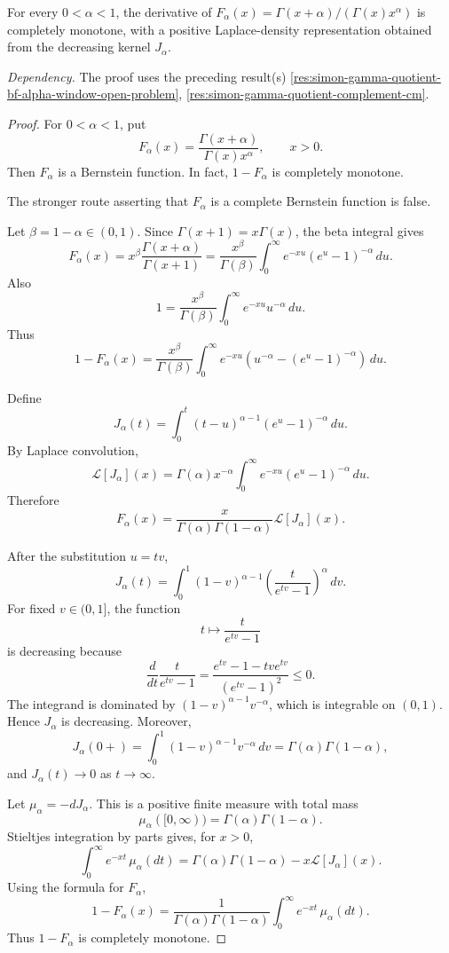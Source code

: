 \begin{theorem}
\label{res:simon-gamma-quotient-derivative-positive-laplace-density}
For every \(0<\alpha<1\), the derivative of \(F_\alpha(x)=\Gamma(x+\alpha)/(\Gamma(x)x^\alpha)\) is completely monotone, with a positive Laplace-density representation obtained from the decreasing kernel \(J_\alpha\).

\emph{Dependency.} The proof uses the preceding result(s) \ref{res:simon-gamma-quotient-bf-alpha-window-open-problem}, \ref{res:simon-gamma-quotient-complement-cm}.
\end{theorem}
\begin{proof}
For \(0<\alpha<1\), put
\[
F_\alpha(x)=\frac{\Gamma(x+\alpha)}{\Gamma(x)x^\alpha},\qquad x>0.
\]
Then \(F_\alpha\) is a Bernstein function. In fact, \(1-F_\alpha\) is completely monotone.

The stronger route asserting that \(F_\alpha\) is a complete Bernstein function is false.

Let \(\beta=1-\alpha\in(0,1)\). Since \(\Gamma(x+1)=x\Gamma(x)\), the beta integral gives
\[
F_\alpha(x)
=x^\beta\frac{\Gamma(x+\alpha)}{\Gamma(x+1)}
=\frac{x^\beta}{\Gamma(\beta)}
\int_0^\infty e^{-xu}(e^u-1)^{-\alpha}\,du.
\]
Also
\[
1=\frac{x^\beta}{\Gamma(\beta)}
\int_0^\infty e^{-xu}u^{-\alpha}\,du.
\]
Thus
\[
1-F_\alpha(x)
=\frac{x^\beta}{\Gamma(\beta)}
\int_0^\infty e^{-xu}\left(u^{-\alpha}-(e^u-1)^{-\alpha}\right)\,du.
\]

Define
\[
J_\alpha(t)=\int_0^t (t-u)^{\alpha-1}(e^u-1)^{-\alpha}\,du.
\]
By Laplace convolution,
\[
\mathcal L[J_\alpha](x)
=\Gamma(\alpha)x^{-\alpha}
\int_0^\infty e^{-xu}(e^u-1)^{-\alpha}\,du.
\]
Therefore
\[
F_\alpha(x)
=\frac{x}{\Gamma(\alpha)\Gamma(1-\alpha)}\mathcal L[J_\alpha](x).
\]

After the substitution \(u=tv\),
\[
J_\alpha(t)=
\int_0^1
(1-v)^{\alpha-1}
\left(\frac{t}{e^{tv}-1}\right)^\alpha\,dv.
\]
For fixed \(v\in(0,1]\), the function
\[
t\mapsto \frac{t}{e^{tv}-1}
\]
is decreasing because
\[
\frac{d}{dt}\frac{t}{e^{tv}-1}
=
\frac{e^{tv}-1-tv e^{tv}}{(e^{tv}-1)^2}\le0.
\]
The integrand is dominated by \((1-v)^{\alpha-1}v^{-\alpha}\), which is integrable on \((0,1)\). Hence \(J_\alpha\) is decreasing. Moreover,
\[
J_\alpha(0+)
=\int_0^1(1-v)^{\alpha-1}v^{-\alpha}\,dv
=\Gamma(\alpha)\Gamma(1-\alpha),
\]
and \(J_\alpha(t)\to0\) as \(t\to\infty\).

Let \(\mu_\alpha=-dJ_\alpha\). This is a positive finite measure with total mass
\[
\mu_\alpha([0,\infty))=\Gamma(\alpha)\Gamma(1-\alpha).
\]
Stieltjes integration by parts gives, for \(x>0\),
\[
\int_0^\infty e^{-xt}\,\mu_\alpha(dt)
=
\Gamma(\alpha)\Gamma(1-\alpha)-x\mathcal L[J_\alpha](x).
\]
Using the formula for \(F_\alpha\),
\[
1-F_\alpha(x)
=
\frac{1}{\Gamma(\alpha)\Gamma(1-\alpha)}
\int_0^\infty e^{-xt}\,\mu_\alpha(dt).
\]
Thus \(1-F_\alpha\) is completely monotone.


\end{proof}
